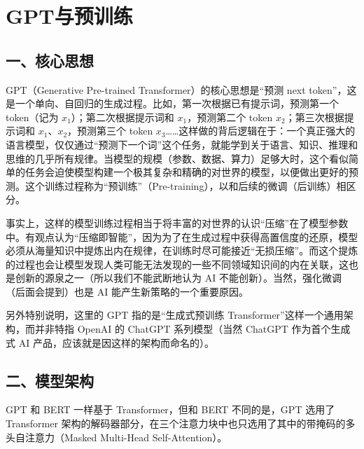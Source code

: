 \setcounter{section}{0}

\hypertarget{gptux4e0eux9884ux8badux7ec3}{%
\section{GPT与预训练}\label{gptux4e0eux9884ux8badux7ec3}}

\hypertarget{ux4e00ux6838ux5fc3ux601dux60f3-5}{%
\subsection{一、核心思想}\label{ux4e00ux6838ux5fc3ux601dux60f3-5}}

GPT（Generative Pre-trained Transformer）的核心思想是``预测 next token''，这是一个单向、自回归的生成过程。比如，第一次根据已有提示词，预测第一个 token（记为 \(x_1\)）；第二次根据提示词和 \(x_1\)，预测第二个 token \(x_2\)；第三次根据提示词和 \(x_1\)、\(x_2\)，预测第三个 token \(x_3\)\ldots\ldots 这样做的背后逻辑在于：一个真正强大的语言模型，仅仅通过``预测下一个词''这个任务，就能学到关于语言、知识、推理和思维的几乎所有规律。当模型的规模（参数、数据、算力）足够大时，这个看似简单的任务会迫使模型构建一个极其复杂和精确的对世界的模型，以便做出更好的预测。这个训练过程称为``预训练''（Pre-training），以和后续的微调（后训练）相区分。

事实上，这样的模型训练过程相当于将丰富的对世界的认识``压缩''在了模型参数中。有观点认为``压缩即智能''，因为为了在生成过程中获得高置信度的还原，模型必须从海量知识中提炼出内在规律，在训练时尽可能接近``无损压缩''。而这个提炼的过程也会让模型发现人类可能无法发现的一些不同领域知识间的内在关联，这也是创新的源泉之一（所以我们不能武断地认为 AI 不能创新）。当然，强化微调（后面会提到）也是 AI 能产生新策略的一个重要原因。

另外特别说明，这里的 GPT 指的是``生成式预训练 Transformer''这样一个通用架构，而并非特指 OpenAI 的 ChatGPT 系列模型（当然 ChatGPT 作为首个生成式 AI 产品，应该就是因这样的架构而命名的）。

\hypertarget{ux4e8cux6a21ux578bux67b6ux6784-1}{%
\subsection{二、模型架构}\label{ux4e8cux6a21ux578bux67b6ux6784-1}}

GPT 和 BERT 一样基于 Transformer，但和 BERT 不同的是，GPT 选用了 Transformer 架构的解码器部分，在三个注意力块中也只选用了其中的带掩码的多头自注意力（Masked Multi-Head Self-Attention）。

